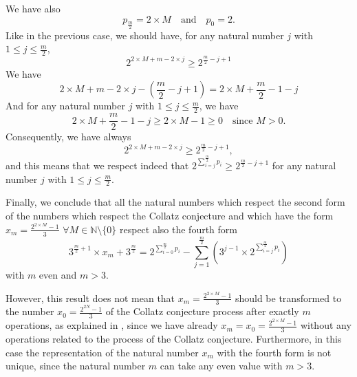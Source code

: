 \documentclass[11pt,a4paper]{article}
\newcommand{\N}{\mathbb{N}}
\newcommand{\Pf}[4]{2^{\sum_{#4=0}^{#1}#3_{#4}}-\sum_{j=1}^{#2}\left(3^{j-1}\times 2^{\sum_{#4=j}^{#1}#3_{#4}}\right)}
\theoremstyle{definition}
\begin{document}
We have also
\begin{equation}
p_{\frac m2}=2\times M\quad\text{and}\quad p_0=2.
\end{equation}
Like in the previous case, we should have, for any natural number $j$ with
$1\le j\le\frac m2$,
\begin{equation}
2^{2\times M+m-2\times j}\ge 2^{\frac m2-j+1}
\end{equation}
We have
\begin{equation}
2\times M+m-2\times j-\left(\frac m2-j+1\right)=2\times M+\frac m2-1-j
\end{equation}
And for any natural number $j$ with $1\le j\le\frac m2$, we have
\begin{equation}
2\times M+\frac m2-1-j\ge 2\times M-1\ge 0\quad\text{since }M>0.
\end{equation}
Consequently, we have always
\begin{equation}
2^{2\times M+m-2\times j}\ge 2^{\frac m2-j+1},
\end{equation}
and this means that we respect indeed that
$2^{\sum_{i=j}^{\frac m2}p_i}\ge 2^{\frac m2-j+1}$ for any natural number $j$ with
$1\le j\le\frac m2$.

Finally, we conclude that all the natural numbers which respect the second form of the
numbers which respect the Collatz conjecture and which have the form
$x_m=\frac{2^{2\times M}-1}{3}$ $\forall M\in\N\setminus\{0\}$ respect also the fourth form
\[3^{\frac m2+1}\times x_m+3^{\frac m2}=\Pf{\frac m2}{\frac m2}{p}{i}\]
with $m$ even and $m>3$.

However, this result does not mean that $x_m=\frac{2^{2\times M}-1}{3}$ should be
transformed to the number $x_0=\frac{2^{2N}-1}{3}$ of the Collatz conjecture process after
exactly $m$ operations, as explained in \citep{Louiz2024}, since we have already
$x_m=x_0=\frac{2^{2\times M}-1}{3}$ without any operations related to the process of the
Collatz conjecture. Furthermore, in this case the representation of the natural number
$x_m$ with the fourth form is not unique, since the natural number $m$ can take any even
value with $m>3$.

\end{document}
